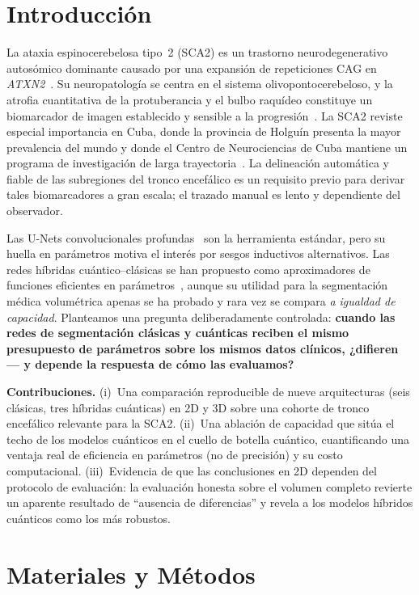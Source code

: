 \documentclass[runningheads]{llncs}
\begin{document}
\section{Introducción}
La ataxia espinocerebelosa tipo~2 (SCA2) es un trastorno neurodegenerativo
autosómico dominante causado por una expansión de repeticiones CAG en
\emph{ATXN2}~\cite{pulst}. Su neuropatología se centra en el sistema
olivopontocerebeloso, y la atrofia cuantitativa de la protuberancia y el bulbo
raquídeo constituye un biomarcador de imagen establecido y sensible a la
progresión~\cite{velazquez}. La SCA2 reviste especial importancia en Cuba, donde
la provincia de Holguín presenta la mayor prevalencia del mundo y donde el
Centro de Neurociencias de Cuba mantiene un programa de investigación de larga
trayectoria~\cite{velazquez}. La delineación automática y fiable de las
subregiones del tronco encefálico es un requisito previo para derivar tales
biomarcadores a gran escala; el trazado manual es lento y dependiente del
observador.

Las U-Nets convolucionales profundas~\cite{unet,unet3d} son la herramienta
estándar, pero su huella en parámetros motiva el interés por sesgos inductivos
alternativos. Las redes híbridas cuántico--clásicas se han propuesto como
aproximadores de funciones eficientes en parámetros~\cite{qcnn}, aunque su
utilidad para la segmentación médica volumétrica apenas se ha probado y rara vez
se compara \emph{a igualdad de capacidad}. Planteamos una pregunta
deliberadamente controlada: \textbf{cuando las redes de segmentación clásicas y
cuánticas reciben el mismo presupuesto de parámetros sobre los mismos datos
clínicos, ¿difieren --- y depende la respuesta de cómo las evaluamos?}

\noindent\textbf{Contribuciones.}
(i)~Una comparación reproducible de nueve arquitecturas (seis clásicas, tres
híbridas cuánticas) en 2D y 3D sobre una cohorte de tronco encefálico relevante
para la SCA2.
(ii)~Una ablación de capacidad que sitúa el techo de los modelos cuánticos en el
cuello de botella cuántico, cuantificando una ventaja real de eficiencia en
parámetros (no de precisión) y su costo computacional.
(iii)~Evidencia de que las conclusiones en 2D dependen del protocolo de
evaluación: la evaluación honesta sobre el volumen completo revierte un aparente
resultado de ``ausencia de diferencias'' y revela a los modelos híbridos
cuánticos como los más robustos.

\section{Materiales y Métodos}
\end{document}
